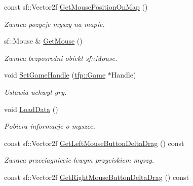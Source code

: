 \begin{DoxyCompactItemize}
const sf\+::\+Vector2f \mbox{\hyperlink{classtfp_1_1_mouse_a1f055556ba7923eae41e8bb0c309ebc5}{Get\+Mouse\+Position\+On\+Map}} ()
\begin{DoxyCompactList}\small\item\em Zwraca pozycje myszy na mapie. \end{DoxyCompactList}\item 
\mbox{\label{classtfp_1_1_mouse_a4e94ce206c7ee9476c58474d870b19ed}} 
sf\+::\+Mouse \& \mbox{\hyperlink{classtfp_1_1_mouse_a4e94ce206c7ee9476c58474d870b19ed}{Get\+Mouse}} ()
\begin{DoxyCompactList}\small\item\em Zwraca bezposredni obiekt sf\+::\+Mouse. \end{DoxyCompactList}\item 
\mbox{\label{classtfp_1_1_mouse_af75de19ef50018ac5e1034957e115d05}} 
void \mbox{\hyperlink{classtfp_1_1_mouse_af75de19ef50018ac5e1034957e115d05}{Set\+Game\+Handle}} (\mbox{\hyperlink{classtfp_1_1_game}{tfp\+::\+Game}} $\ast$Handle)
\begin{DoxyCompactList}\small\item\em Ustawia uchwyt gry. \end{DoxyCompactList}\item 
void \mbox{\hyperlink{classtfp_1_1_mouse_a9cad9f88ae445c0bca5eb489216e4160}{Load\+Data}} ()
\begin{DoxyCompactList}\small\item\em Pobiera informacje o myszce. \end{DoxyCompactList}\item 
\mbox{\label{classtfp_1_1_mouse_a522779ab55451c915ae4451561062c95}} 
const sf\+::\+Vector2f \mbox{\hyperlink{classtfp_1_1_mouse_a522779ab55451c915ae4451561062c95}{Get\+Left\+Mouse\+Button\+Delta\+Drag}} () const
\begin{DoxyCompactList}\small\item\em Zwraca przeciagniecie lewym przyciskiem myszy. \end{DoxyCompactList}\item 
\mbox{\label{classtfp_1_1_mouse_a48a1f58c7e4786b1be82cecef9fa6a41}} 
const sf\+::\+Vector2f \mbox{\hyperlink{classtfp_1_1_mouse_a48a1f58c7e4786b1be82cecef9fa6a41}{Get\+Right\+Mouse\+Button\+Delta\+Drag}} () const

\end{DoxyCompactItemize}
